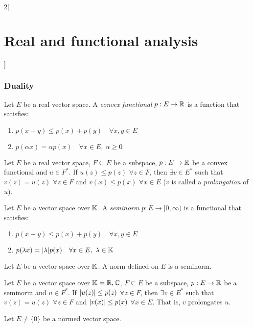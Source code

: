 \documentclass[../../../main_math.tex]{subfiles}
\begin{document}
\begin{multicols}{2}[\section{Real and functional analysis}]
  \subsubsection{Duality}
  \begin{definition}
    Let $E$ be a real vector space. A \emph{convex functional} $p:E\rightarrow\mathbb{R}$ is a function that satisfies:
    \begin{enumerate}
      \item $p(x+y)\leq p(x)+p(y)\quad\forall x,y\in E$
      \item $p(\alpha x)=\alpha p(x)\quad\forall x\in E,\ \alpha\geq 0$
    \end{enumerate}
  \end{definition}
  \begin{theorem}
    Let $E$ be a real vector space, $F\subseteq E$ be a subspace, $p:E\rightarrow\mathbb{R}$ be a convex functional and $u\in F^*$. If $u(z)\leq p(z)$ $\forall z\in F$, then $\exists v\in E^*$ such that $v(z)=u(z)$ $\forall z\in F$ and $v(x)\leq p(x)$ $\forall x\in E$ ($v$ is called a \emph{prolongation} of $u$).
  \end{theorem}
  \begin{definition}[Seminorm]
    Let $E$ be a vector space over $\mathbb{K}$. A \emph{seminorm} $p:E\rightarrow[0,\infty)$ is a functional that satisfies:
    \begin{enumerate}
      \item $p(x+y)\leq p(x)+p(y)\quad\forall x,y\in E$
      \item $p(\lambda x)=\abs{\lambda} p(x)\quad\forall x\in E,\ \lambda\in\mathbb{K}$
    \end{enumerate}
  \end{definition}
  \begin{lemma}
    Let $E$ be a vector space over $\mathbb{K}$. A norm defined on $E$ is a seminorm.
  \end{lemma}
  \begin{theorem}
    Let $E$ be a vector space over $\mathbb{K}=\mathbb{R},\mathbb{C}$, $F\subseteq E$ be a subspace, $p:E\rightarrow\mathbb{R}$ be a seminorm and $u\in F^*$. If $\abs{u(z)}\leq p(z)$ $\forall z\in F$, then $\exists v\in E^*$ such that $v(z)=u(z)$ $\forall z\in F$ and $\abs{v(x)}\leq p(x)$ $\forall x\in E$. That is, $v$ prolongates $u$.
  \end{theorem}
  \begin{theorem}
    Let $E\ne\{0\}$ be a normed vector space.
    \begin{enumerate}

\end{enumerate}
\end{theorem}
\end{multicols}
\end{document}
